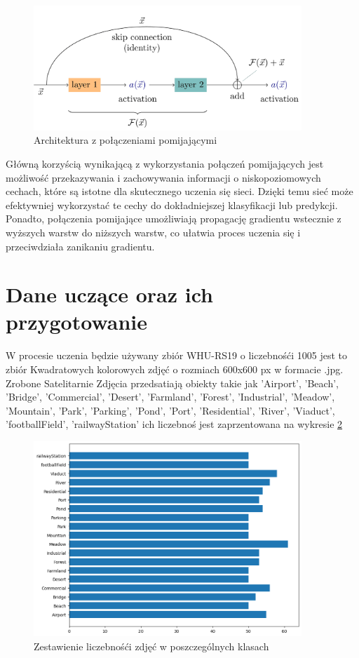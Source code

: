 \documentclass[12pt,twoside]{article}
\begin{document}
\begin{figure}[ht]
	\centering
	\includegraphics[width=0.9\textwidth]{figures/skip-connection.png}
	\caption{Architektura z połączeniami pomijającymi}
	\label{fig:skip_cone}
  \end{figure}

Główną korzyścią wynikającą z wykorzystania połączeń pomijających jest możliwość przekazywania i zachowywania informacji o niskopoziomowych cechach, które są istotne dla skutecznego uczenia się sieci. Dzięki temu sieć może efektywniej wykorzystać te cechy do dokładniejszej klasyfikacji lub predykcji. Ponadto, połączenia pomijające umożliwiają propagację gradientu wstecznie z wyższych warstw do niższych warstw, co ułatwia proces uczenia się i przeciwdziała zanikaniu gradientu.
\clearpage

\section{Dane uczące oraz ich przygotowanie}




W procesie uczenia będzie używany zbiór WHU-RS19 o liczebnośći 1005 jest to zbiór Kwadratowych kolorowych zdjęć o rozmiach 600x600 px w formacie .jpg. Zrobone Satelitarnie Zdjęcia przedsatiają  obiekty takie jak  'Airport',
'Beach',
'Bridge',
'Commercial',
'Desert',
'Farmland',
'Forest',
'Industrial',
'Meadow',
'Mountain',
'Park',
'Parking',
'Pond',
'Port',
'Residential',
'River',
'Viaduct',
'footballField',
'railwayStation'  ich liczebnoś jest zaprzentowana na wykresie \ref{fig:dane}

\begin{figure}[ht]
	\centering
	\includegraphics[width=0.9\textwidth]{figures/dane_class.png}
	\caption{Zestawienie liczebnośći zdjęć w poszczególnych klasach}
	\label{fig:dane}
  \end{figure}
\end{document}
